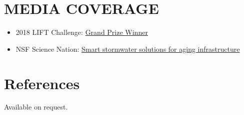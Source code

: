 \documentclass{my_cv}
\begin{document}
\section*{MEDIA COVERAGE}
\begin{itemize}
	\item 2018 LIFT Challenge: \href{https://cee.engin.umich.edu/stories/joint-u-m-and-glwa-team-wins-inaugural-intelligent-water-challenge/}{Grand Prize Winner}
	\item NSF Science Nation: \href{https://www.youtube.com/watch?v=mStPThxAU08}{Smart stormwater solutions for aging infrastructure}
\end{itemize}

\section*{References}
Available on request. 
\end{document}

